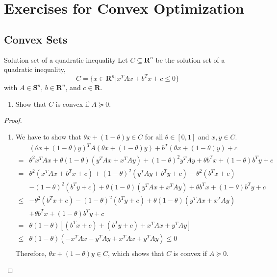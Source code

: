 \chapter{Exercises for Convex Optimization}

\section{Convex Sets}

\begin{exercise}{Solution set of a quadratic inequality}
	Let $C\subseteq\mathbf{R}^{n}$ be the solution set of a quadratic inequality,
	\begin{equation*}
		C=\{x\in\mathbf{R}^{n}\vert x^{T}Ax+b^{T}x+c\leq 0\}
	\end{equation*}
	with $A\in\mathbf{S}^{n}$, $b\in\mathbf{R}^{n}$, and $c\in\mathbf{R}$.
	\begin{enumerate}
		\item Show that $C$ is convex if $A\succeq 0$.
	\end{enumerate}
\end{exercise}

\begin{proof}
	\begin{enumerate}
		\item
		      We have to show that $\theta x+(1-\theta)y\in C$ for all $\theta\in[0,1]$ and $x,y\in C$.
		      \begin{equation*}
			      \begin{aligned}
				           & (\theta x+(1-\theta)y)^{T}A(\theta x+(1-\theta)y)+b^{T}(\theta x+(1-\theta)y)+c            \\
				      =    & \theta^2x^TAx+\theta(1-\theta)(y^TAx+x^TAy)+(1-\theta)^2y^TAy+\theta b^Tx+(1-\theta)b^Ty+c \\
				      =    & \theta^2(x^{T}Ax+b^{T}x+c)+(1-\theta)^2(y^{T}Ay+b^{T}y+c)-\theta^2(b^{T}x+c)               \\
				           & -(1-\theta)^2(b^{T}y+c)+\theta(1-\theta)(y^TAx+x^TAy)+\theta b^Tx+(1-\theta)b^Ty+c         \\
				      \leq & -\theta^2(b^{T}x+c)-(1-\theta)^2(b^{T}y+c)+\theta(1-\theta)(y^TAx+x^TAy)                   \\
				           & +\theta b^Tx+(1-\theta)b^Ty+c                                                              \\
				      =    & \theta(1-\theta)[(b^Tx+c)+(b^Ty+c)+x^TAx+y^TAy]                                            \\
				      \leq & \theta(1-\theta)(-x^TAx-y^TAy+x^TAx+y^TAy)\leq 0                                           \\
			      \end{aligned}
		      \end{equation*}
		      Therefore, $\theta x+(1-\theta)y\in C$, which shows that $C$ is convex if $A\succeq 0$.
	\end{enumerate}

\end{proof}
